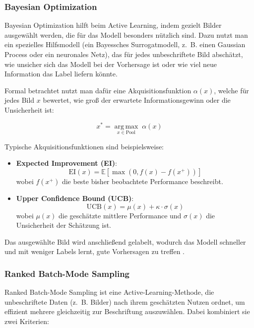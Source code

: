 \documentclass{article}
\DeclareMathOperator*{\argmax}{arg\,max}
\begin{document}
	
	\subsubsection{Bayesian Optimization}
	Bayesian Optimization hilft beim Active Learning, indem gezielt Bilder ausgewählt werden, die für das Modell besonders nützlich sind. Dazu nutzt man ein spezielles Hilfsmodell (ein Bayessches Surrogatmodell, z.~B. einen Gaussian Process oder ein neuronales Netz), das für jedes unbeschriftete Bild abschätzt, wie unsicher sich das Modell bei der Vorhersage ist oder wie viel neue Information das Label liefern könnte.
	
	Formal betrachtet nutzt man dafür eine Akquisitionsfunktion $\alpha(x)$, welche für jedes Bild $x$ bewertet, wie groß der erwartete Informationsgewinn oder die Unsicherheit ist:
	
	\begin{equation}
		x^* = \underset{x \in \mathrm{Pool}}{\argmax} \; \alpha(x)
	\end{equation}
	
	Typische Akquisitionsfunktionen sind beispielsweise:
	
	\begin{itemize}
		\item \textbf{Expected Improvement (EI)}:
		\begin{equation}
			\mathrm{EI}(x) = \mathbb{E}\left[\max\left(0, f(x) - f(x^+)\right)\right]
		\end{equation}
		wobei $f(x^+)$ die beste bisher beobachtete Performance beschreibt.
		
		\item \textbf{Upper Confidence Bound (UCB)}:
		\begin{equation}
			\mathrm{UCB}(x) = \mu(x) + \kappa \cdot \sigma(x)
		\end{equation}
		wobei $\mu(x)$ die geschätzte mittlere Performance und $\sigma(x)$ die Unsicherheit der Schätzung ist.
	\end{itemize}
	
	Das ausgewählte Bild wird anschließend gelabelt, wodurch das Modell schneller und mit weniger Labels lernt, gute Vorhersagen zu treffen \cite{Gal2017}.
	
	
	\subsubsection{Ranked Batch-Mode Sampling}
	Ranked Batch-Mode Sampling ist eine Active-Learning-Methode, die unbeschriftete Daten (z.~B. Bilder) nach ihrem geschätzten Nutzen ordnet, um effizient mehrere gleichzeitig zur Beschriftung auszuwählen. Dabei kombiniert sie zwei Kriterien:
	
\end{document}
